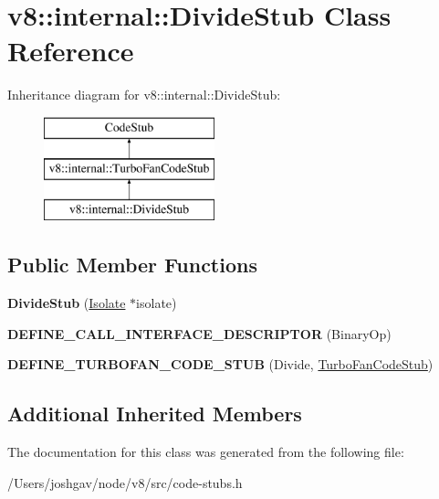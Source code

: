 \hypertarget{classv8_1_1internal_1_1_divide_stub}{}\section{v8\+:\+:internal\+:\+:Divide\+Stub Class Reference}
\label{classv8_1_1internal_1_1_divide_stub}
Inheritance diagram for v8\+:\+:internal\+:\+:Divide\+Stub\+:\begin{figure}[H]
\begin{center}
\leavevmode
\includegraphics[height=3.000000cm]{classv8_1_1internal_1_1_divide_stub}
\end{center}
\end{figure}
\subsection*{Public Member Functions}
\begin{DoxyCompactItemize}
\item 
{\bfseries Divide\+Stub} (\hyperlink{classv8_1_1internal_1_1_isolate}{Isolate} $\ast$isolate)\hypertarget{classv8_1_1internal_1_1_divide_stub_aebd5f62c9d5802baba480a042931cb21}{}\label{classv8_1_1internal_1_1_divide_stub_aebd5f62c9d5802baba480a042931cb21}

\item 
{\bfseries D\+E\+F\+I\+N\+E\+\_\+\+C\+A\+L\+L\+\_\+\+I\+N\+T\+E\+R\+F\+A\+C\+E\+\_\+\+D\+E\+S\+C\+R\+I\+P\+T\+OR} (Binary\+Op)\hypertarget{classv8_1_1internal_1_1_divide_stub_a3728b51658437472481786f4f574ec81}{}\label{classv8_1_1internal_1_1_divide_stub_a3728b51658437472481786f4f574ec81}

\item 
{\bfseries D\+E\+F\+I\+N\+E\+\_\+\+T\+U\+R\+B\+O\+F\+A\+N\+\_\+\+C\+O\+D\+E\+\_\+\+S\+T\+UB} (Divide, \hyperlink{classv8_1_1internal_1_1_turbo_fan_code_stub}{Turbo\+Fan\+Code\+Stub})\hypertarget{classv8_1_1internal_1_1_divide_stub_a6ac779b9c2596ce860dd74860359d1c1}{}\label{classv8_1_1internal_1_1_divide_stub_a6ac779b9c2596ce860dd74860359d1c1}

\end{DoxyCompactItemize}
\subsection*{Additional Inherited Members}


The documentation for this class was generated from the following file\+:\begin{DoxyCompactItemize}
\item 
/\+Users/joshgav/node/v8/src/code-\/stubs.\+h\end{DoxyCompactItemize}
